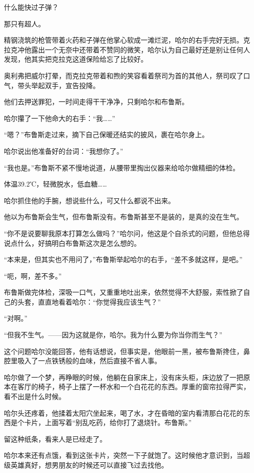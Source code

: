 \documentclass[../main]{subfiles}
\begin{document}
什么能快过子弹？

那只有超人。

精钢浇筑的枪管带着火药和子弹在他掌心软成一滩烂泥，哈尔的右手完好无损。克拉克冲他露出一个无奈中还带着不赞同的微笑，哈尔认为自己最好还是别让任何人发现，他其实把克拉克这道保险给忘了比较好。

奥利弗把威尔打晕，而克拉克带着和煦的笑容看着祭司为首的其他人，祭司叹了口气，带头举起双手，宣告投降。

他们去押送罪犯，一时间走得干干净净，只剩哈尔和布鲁斯。

哈尔攥了一下他命大的右手：“我\ldots\ldots”

“嗯？”布鲁斯走过来，摘下自己保暖还结实的披风，裹在哈尔身上。

哈尔说出他准备好的台词：“我想你了。”

“我也是。”布鲁斯不紧不慢地说道，从腰带里掏出仪器来给哈尔做精细的体检。

体温39.2℃，轻微脱水，低血糖……

哈尔抓住他的手腕，想说些什么，可又什么都说不出来。

他以为布鲁斯会生气，但布鲁斯没有。布鲁斯甚至不是装的，是真的没在生气。

“你不是说要聊我原本打算怎么做吗？”哈尔问，他这是个自杀式的问题，但他总得说点什么，好搞明白布鲁斯这次是怎么想的。

“本来是，但其实也不用问了，”布鲁斯举起哈尔的右手，“差不多就这样，是吧。”

“呃，啊，差不多。”

布鲁斯做完体检，深吸一口气，又重重地吐出来，依然觉得不大舒服，索性掀了自己的头套，直直地看着哈尔：“你觉得我应该生气？”

“对啊。”

“但我不生气。——因为这就是你，哈尔。我为什么要为你当你而生气？”

这个问题哈尔没能回答，他有话想说，但事实是，他眼前一黑，被布鲁斯搀住，鼻腔里吸入了一点铁锈般的血味，然后直接不省人事。

哈尔做了一个梦，再睁眼的时候，他躺在自家床上，没有床头柜，床边放了一把原本在客厅的椅子，椅子上摆了一杯水和一个白花花的东西。厚重的窗帘拉得严实，看不出是什么时候。

哈尔头还疼着，他揉着太阳穴坐起来，喝了水，才在昏暗的室内看清那白花花的东西是个卡片，上面写着“别乱吃药，给你打了退烧针。布鲁斯。”

留这种纸条，看来人是已经走了。

哈尔本来还有点饿，看到这张卡片，突然一下子就饱了。这时候他才意识到，当超级英雄真好，想男朋友的时候还可以直接飞过去找他。
\end{document}
